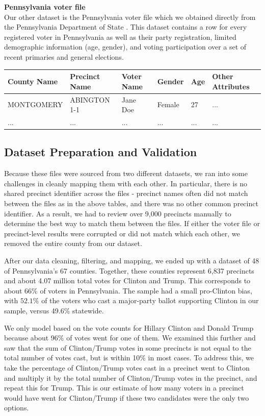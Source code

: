 \documentclass[10pt, letterpaper]{article}
\begin{document}
\noindent \textbf{Pennsylvania voter file} \\
Our other dataset is the Pennsylvania voter file which we obtained directly from the Pennsylvania Department of State \cite{PAVoterFile}. This dataset contains a row for every registered voter in Pennsylvania as well as their party registration, limited demographic information (age, gender), and voting participation over a set of recent primaries and general elections.
\begin{table}[H]
\begin{center}
\begin{tabular}{ |l|l|l|l|l|l| } 
\hline
County Name & Precinct Name & Voter Name & Gender & Age & Other Attributes \\
\hline \hline
MONTGOMERY & ABINGTON 1-1 & Jane Doe & Female & 27 & ... \\
\hline
... & ... & ... & ... & ... & ... \\
\hline
\end{tabular}
\end{center}
\end{table}

\subsection{Dataset Preparation and Validation}

Because these files were sourced from two different datasets, we ran into some challenges in cleanly mapping them with each other. In particular, there is no shared precinct identifier across the files - precinct names often did not match between the files as in the above tables, and there was no other common precinct identifier. As a result, we had to review over 9,000 precincts manually to determine the best way to match them between the files. If either the voter file or precinct-level results were corrupted or did not match which each other, we removed the entire county from our dataset.

After our data cleaning, filtering, and mapping, we ended up with a dataset of 48 of Pennsylvania's 67 counties. Together, these counties represent 6,837 precincts and about 4.07 million total votes for Clinton and Trump. This corresponds to about 66\% of voters in Pennsylvania. The sample had a small pro-Clinton bias, with $52.1\%$ of the voters who cast a major-party ballot supporting Clinton in our sample, versus 49.6\% statewide. 

We only model based on the vote counts for Hillary Clinton and Donald Trump because about 96\% of votes went for one of them. We examined this further and saw that the sum of Clinton/Trump votes in some precincts is not equal to the total number of votes cast, but is within 10\% in most cases. To address this, we take the percentage of Clinton/Trump votes cast in a precinct went to Clinton and multiply it by the total number of Clinton/Trump votes in the precinct, and repeat this for Trump. This is our estimate of how many voters in a precinct would have went for Clinton/Trump if these two candidates were the only two options.
\end{document}
